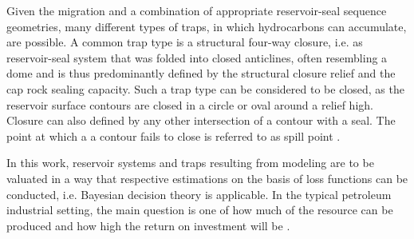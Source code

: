         Given the migration and a combination of appropriate reservoir-seal sequence geometries, many different types of traps, in which hydrocarbons can accumulate, are possible. A common trap type is a structural four-way closure, i.e. as reservoir-seal system that was folded into closed anticlines, often resembling a dome and is thus predominantly defined by the structural closure relief and the cap rock sealing capacity. Such a trap type can be considered to be closed, as the reservoir surface contours are closed in a circle or oval around a relief high. Closure can also defined by any other intersection of a contour with a seal. The point at which a a contour fails to close is referred to as spill point \citep{dolson2016basics}.
        
        In this work, reservoir systems and traps resulting from modeling are to be valuated in a way that respective estimations on the basis of loss functions can be conducted, i.e. Bayesian decision theory is applicable. In the typical petroleum industrial setting, the main question is one of how much of the resource can be produced and how high the return on investment will be \citep{dean2007volumetric}.
        

